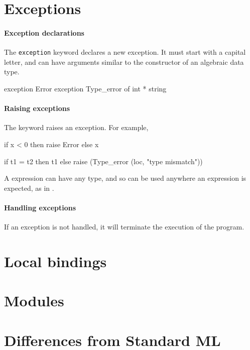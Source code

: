 \documentclass[12pt,a4paper]{book}
\begin{document}
\section{Exceptions}

\paragraph{Exception declarations}
The \texttt{exception} keyword declares a new exception. It must
start with a capital letter, and can have arguments similar to the constructor
of an algebraic data type.
\begin{smlcode}
exception Error
exception Type_error of int * string
\end{smlcode}

\paragraph{Raising exceptions}
The  keyword raises an exception. For example,
\begin{smlcode}
if x < 0 then raise Error
else x
\end{smlcode}

\begin{smlcode}
if t1 = t2 then t1
else raise (Type_error (loc, "type mismatch"))
\end{smlcode}

A  expression can have any type, and so can be used anywhere
an expression is expected, as in .

\paragraph{Handling exceptions}
If an exception is not handled, it will terminate the execution of the program.



\section{Local bindings}



\section{Modules}

\section{Differences from Standard ML}
\end{document}

